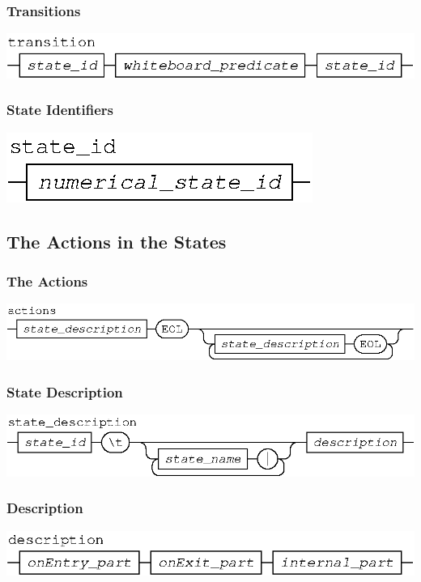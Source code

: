 \documentclass[11pt]{article}
\begin{document}
\subsubsection{Transitions}

\begin{center}
\includegraphics{transition}
\end{center}
%
\subsubsection{State Identifiers}

\begin{center}
\includegraphics{state_id}
\end{center}
%
%
\subsection{The Actions in the States}
%
\subsubsection{The Actions}

\begin{center}
\includegraphics{actions}
\end{center}
%
\subsubsection{State Description}

\begin{center}
\includegraphics{state_description}
\end{center}
%
\subsubsection{Description}

\begin{center}
\includegraphics{description}
\end{center}
%
\end{document}
